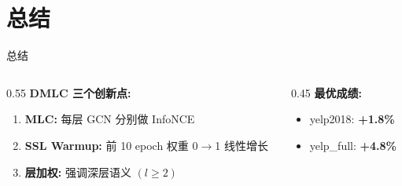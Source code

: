 \documentclass[9pt, aspectratio=169]{ctexbeamer}
\begin{document}
\section{总结}
\begin{frame}{总结}
  \begin{columns}[t]
    \begin{column}{0.55\textwidth}
      \textbf{DMLC 三个创新点:}
      \begin{enumerate}\footnotesize
        \item \textbf{MLC:} 每层 GCN 分别做 InfoNCE
        \item \textbf{SSL Warmup:} 前 10 epoch 权重 0$\to$1 线性增长
        \item \textbf{层加权:} 强调深层语义 $(l\geq2)$
      \end{enumerate}
    \end{column}
    \begin{column}{0.45\textwidth}
      \textbf{最优成绩:}
      \begin{itemize}\footnotesize
        \item yelp2018: \textbf{+1.8\%}
        \item yelp\_full: \textbf{+4.8\%}
      \end{itemize}
    \end{column}
  \end{columns}
\end{frame}
\end{document}
